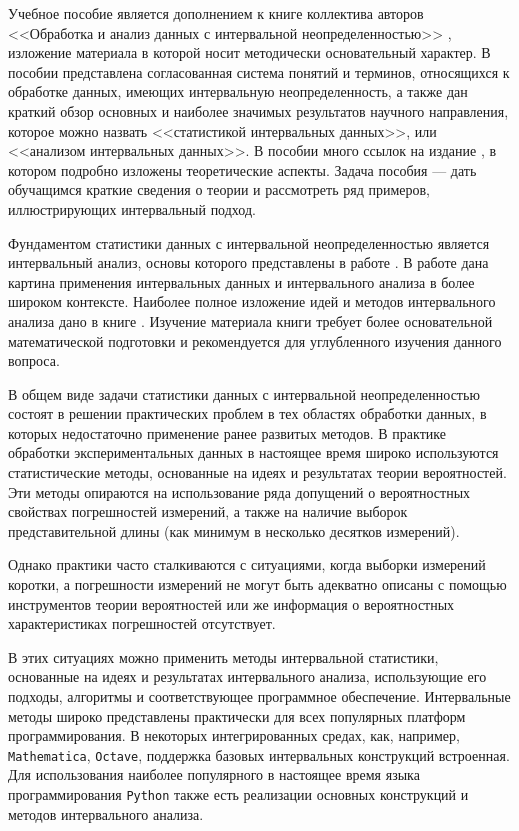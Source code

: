 \documentclass[a5paper,openany]{book}
\begin{document}
{{Учебное пособие является дополнением к книге коллектива авторов
<<Обработка и анализ данных с интервальной неопределенностью>> \cite{MetodikaBook}, изложение материала в которой носит методически основательный характер.
В пособии представлена согласованная система понятий и терминов, относящихся к обработке данных, имеющих интервальную  неопределенность, а также
дан краткий обзор основных и наиболее значимых результатов научного направления, которое можно назвать <<статистикой интервальных данных>>, или <<анализом интервальных 
данных>>. В пособии много ссылок на издание \cite{MetodikaBook}, в котором подробно изложены теоретические аспекты.
Задача пособия --- дать обучащимся краткие сведения о теории и рассмотреть ряд примеров, иллюстрирующих интервальный подход. 


Фундаментом статистики данных с интервальной неопределенностью является интервальный анализ, 
основы которого  представлены в  работе \cite{SPbSTU2020}. В работе  \cite{SPbSTU2021} дана картина применения интервальных данных и интервального анализа в более широком контексте. 
Наиболее полное изложение идей и методов интервального анализа дано в книге \cite{SSharyBook}. Изучение материала  книги  \cite{SSharyBook} требует более основательной математической подготовки и рекомендуется для углубленного изучения данного вопроса.

В общем виде задачи статистики данных с интервальной неопределенностью состоят в решении практических проблем в тех областях обработки данных, в которых недостаточно применение ранее развитых методов.
В практике обработки экспериментальных данных в настоящее время широко используются 
статистические методы, основанные на идеях и результатах теории вероятностей. Эти методы 
опираются на использование ряда допущений о вероятностных свойствах погрешностей 
измерений, а также на наличие выборок представительной длины (как минимум в несколько 
десятков измерений). 

Однако практики часто сталкиваются с ситуациями, когда выборки 
измерений коротки, а погрешности 
измерений не могут быть адекватно описаны с помощью инструментов теории вероятностей 
или же информация о вероятностных характеристиках погрешностей отсутствует. 

В этих ситуациях можно применить методы интервальной статистики, основанные на идеях и результатах интервального анализа, использующие его подходы, алгоритмы и соответствующее программное обеспечение. 
Интервальные методы широко представлены практически для всех популярных платформ программирования. В некоторых интегрированных средах, как, например, {\tt Mathematica}, {\tt Octave}, поддержка базовых интервальных конструкций встроенная.   
Для использования наиболее популярного в настоящее время языка программирования {\tt Python} также есть реализации основных конструкций и методов интервального анализа. 

}}
\end{document}
